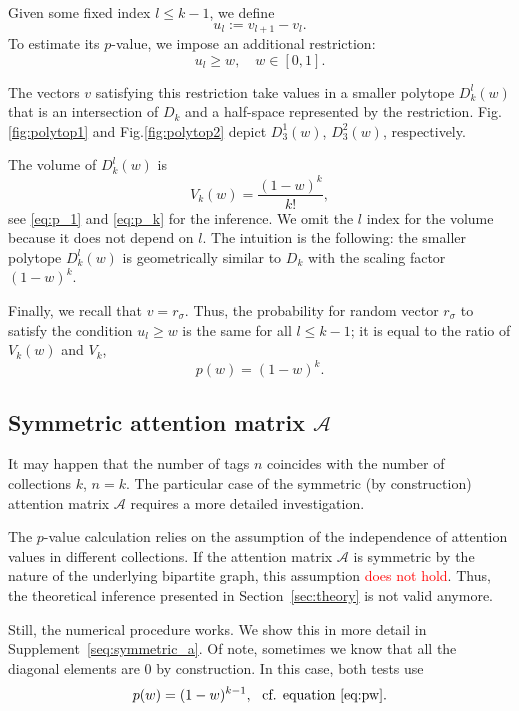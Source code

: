 \documentclass{llncs}
\begin{document}
Given some fixed index $l\leq k-1$, we define
\[
u_{l} := v_{l+1} - v_{l}. 
\]
To estimate its $p$-value, we impose an additional restriction:
\[
u_{l} \ge w, \quad w \in [0, 1].
\]

The vectors $v$ satisfying this restriction take values in a smaller polytope $D^{l}_{k}(w)$ that is an intersection of $D_{k}$ and a half-space represented by the restriction.
Fig.\ref{fig:polytop1} and Fig.\ref{fig:polytop2} depict $D^{1}_{3}(w)$, $D^{2}_{3}(w)$, respectively. 

The volume of $D^{l}_{k}(w)$ is 
\begin{equation}
V_{k}(w) = \frac{(1-w)^k}{k!},
\end{equation}
see \eqref{eq:p_1} and \eqref{eq:p_k} for the inference. We omit the $l$ index for the volume because it does not depend on $l$. The intuition is the following: the smaller polytope $D^{l}_{k}(w)$ is geometrically similar to $D_{k}$ with the scaling factor $(1-w)^k$. 

Finally, we recall that $v = r_{\sigma}$. Thus, the probability for random vector $r_{\sigma}$ to satisfy the condition $u_{l} \ge w$ is the same for all $l\leq k-1$; it is equal to the ratio of $V_{k}(w)$ and $V_k$,
\begin{equation}
\label{eq:pw}
    p(w) = (1-w)^k.
\end{equation}


\subsection{Symmetric attention matrix $\mathcal{A}$}
It may happen that the number of tags $n$ coincides with the number of collections $k$, $n = k$. The particular case of the symmetric (by construction) attention matrix $\mathcal{A}$ requires a more detailed investigation.

The $p$-value calculation relies on the assumption of the independence of attention values in different collections. If the attention matrix $\mathcal{A}$ is symmetric by the nature of the underlying bipartite graph, this assumption \textcolor{red}{does not hold}. Thus, the theoretical inference presented in Section~\ref{sec:theory} is not valid anymore.

Still, the numerical procedure works. We show this in more detail in Supplement~\ref{seq:symmetric_a}. Of note, sometimes we know that all the diagonal elements are $0$ by construction. In this case, both tests use 
\[
p(w) = (1-w)^{k-1}, ~~\text{cf. equation \eqref{eq:pw}.}
\]
\end{document}
